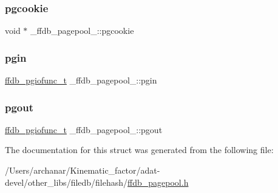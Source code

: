 \subsubsection{\texorpdfstring{pgcookie}{pgcookie}}
{\footnotesize\ttfamily void $\ast$ \+\_\+ffdb\+\_\+pagepool\+\_\+\+::pgcookie}

\mbox{\label{struct__ffdb__pagepool___a924150097b3bab2a4cc04415b9cf5ed4}} 
\subsubsection{\texorpdfstring{pgin}{pgin}}
{\footnotesize\ttfamily \mbox{\hyperlink{adat__devel_2other__libs_2filedb_2filehash_2ffdb__pagepool_8h_abe9c83a47a1f5babe21df1582aeb8022}{ffdb\+\_\+pgiofunc\+\_\+t}} \+\_\+ffdb\+\_\+pagepool\+\_\+\+::pgin}

\mbox{\label{struct__ffdb__pagepool___aea51254f721e3ef10da84d3afade7f4c}} 
\subsubsection{\texorpdfstring{pgout}{pgout}}
{\footnotesize\ttfamily \mbox{\hyperlink{adat__devel_2other__libs_2filedb_2filehash_2ffdb__pagepool_8h_abe9c83a47a1f5babe21df1582aeb8022}{ffdb\+\_\+pgiofunc\+\_\+t}} \+\_\+ffdb\+\_\+pagepool\+\_\+\+::pgout}



The documentation for this struct was generated from the following file\+:\begin{DoxyCompactItemize}
\item 
/\+Users/archanar/\+Kinematic\+\_\+factor/adat-\/devel/other\+\_\+libs/filedb/filehash/\mbox{\hyperlink{adat-devel_2other__libs_2filedb_2filehash_2ffdb__pagepool_8h}{ffdb\+\_\+pagepool.\+h}}\end{DoxyCompactItemize}
